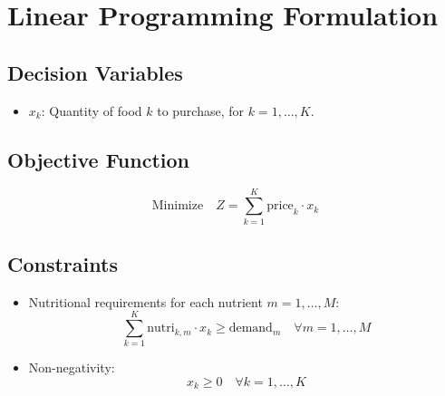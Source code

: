 \documentclass{article}
\begin{document}
\section*{Linear Programming Formulation}

\subsection*{Decision Variables}
\begin{itemize}
    \item \( x_k \): Quantity of food \( k \) to purchase, for \( k = 1, \ldots, K \).
\end{itemize}

\subsection*{Objective Function}
\[
\text{Minimize} \quad Z = \sum_{k=1}^{K} \text{price}_k \cdot x_k
\]

\subsection*{Constraints}
\begin{itemize}
    \item Nutritional requirements for each nutrient \( m = 1, \ldots, M \):
    \[
    \sum_{k=1}^{K} \text{nutri}_{k, m} \cdot x_k \geq \text{demand}_m \quad \forall m = 1, \ldots, M
    \]
    \item Non-negativity:
    \[
    x_k \geq 0 \quad \forall k = 1, \ldots, K
    \]
\end{itemize}
\end{document}
